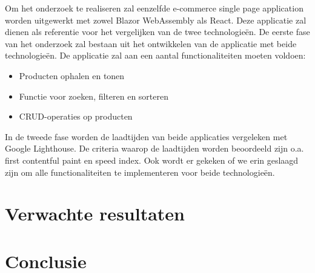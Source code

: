 \documentclass{hogent-article}
\begin{document}
Om het onderzoek te realiseren zal eenzelfde e-commerce single page application worden uitgewerkt met zowel Blazor WebAssembly als React. Deze applicatie zal dienen als referentie voor het vergelijken van de twee technologieën.
\newline\newline
De eerste fase van het onderzoek zal bestaan uit het ontwikkelen van de applicatie met beide technologieën. De applicatie zal aan een aantal functionaliteiten moeten voldoen:

\begin{itemize}
    \item Producten ophalen en tonen
    \item Functie voor zoeken, filteren en sorteren
    \item CRUD-operaties op producten
\end{itemize}

In de tweede fase worden de laadtijden van beide applicaties vergeleken met Google Lighthouse. De criteria waarop de laadtijden worden beoordeeld zijn o.a. first contentful paint en speed index. Ook wordt er gekeken of we erin geslaagd zijn om alle functionaliteiten te implementeren voor beide technologieën.

\section{Verwachte resultaten}%
\label{sec:verwachte-resultaten}


\lipsum[14-18]

\section{Conclusie}%
\label{sec:discussie-conclusie}

\lipsum[19-21]


\printbibliography[heading=bibintoc]
\end{document}
